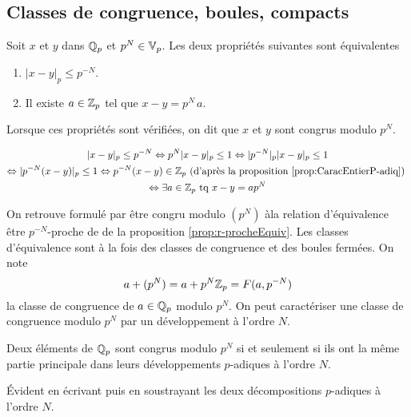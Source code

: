 \subsection{Classes de congruence, boules, compacts}
\begin{defi}
 Soit $x$ et $y$ dans $\mathbb{Q}_p$ et $p^N \in \mathbb{V}_p$. Les deux propriétés suivantes sont équivalentes
 \begin{enumerate}
  \item $|x-y|_p \leq p^{-N}$.
  \item Il existe $a\in \mathbb{Z}_p$ tel que $x-y = p^N\, a$.
 \end{enumerate}
\end{defi}
Lorsque ces propriétés sont vérifiées, on dit que $x$ et $y$ sont congrus modulo $p^N$.
\begin{demo}
\begin{multline*}
 |x-y|_p \leq p^{-N} \Leftrightarrow p^{N}|x-y|_p \leq 1
 \Leftrightarrow |p^{-N}|_p|x-y|_p \leq 1 \\
 \Leftrightarrow |p^{-N} (x-y)|_p \leq 1
 \Leftrightarrow p^{-N} (x-y) \in \mathbb{Z}_p \text{ (d'après la proposition \ref{prop:CaracEntierP-adiq}) }\\
 \Leftrightarrow \exists a \in \mathbb{Z}_p \text{ tq }x-y = a p^N
\end{multline*}
\end{demo}
\noindent On retrouve formulé par \og être congru modulo $(p^N)$ à\fg la relation d'équivalence  \og être $p^{-N}$-proche de \fg de la proposition \ref{prop:r-procheEquiv}. Les classes d'équivalence sont à la fois des classes de congruence et des boules fermées. On note
\begin{displaymath}
 a + (p^N) = a + p^N \mathbb{Z}_p = F(a,p^{-N})
\end{displaymath}
la classe de congruence de $a \in \mathbb{Q}_p$ modulo $p^N$.\newline
On peut caractériser une classe de congruence modulo $p^N$ par un développement à l'ordre $N$.
\begin{prop}
Deux éléments de $\mathbb{Q}_p$ sont congrus modulo $p^N$ si et seulement si ils ont la même partie principale dans leurs développements $p$-adiques à l'ordre $N$.
\end{prop}
\begin{demo}
Évident en écrivant puis en soustrayant les deux décompositions $p$-adiques à l'ordre $N$.
\end{demo}

